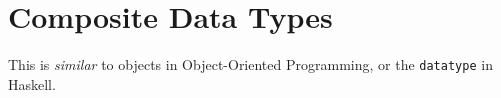 \section{Composite Data Types}\label{sec:Composite_Data_Types}
This is \textit{similar} to objects in Object-Oriented Programming, or the \texttt{datatype} in Haskell.


